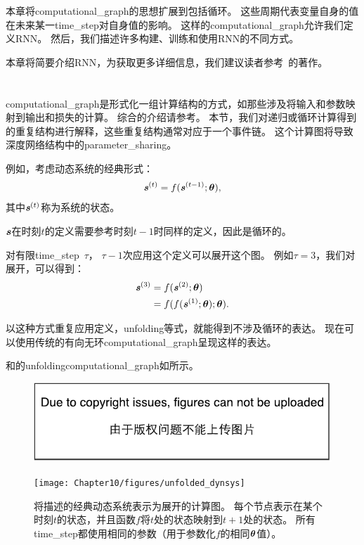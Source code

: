 本章将\gls{computational_graph}的思想扩展到包括循环。
这些周期代表变量自身的值在未来某一\gls{time_step}对自身值的影响。
这样的\gls{computational_graph}允许我们定义\gls{RNN}。
然后，我们描述许多构建、训练和使用\gls{RNN}的不同方式。

本章将简要介绍\gls{RNN}，为获取更多详细信息，我们建议读者参考~\cite{Graves-book2012}的著作。


\section{}
\label{sec:unfolding_computational_graphs}
\gls{computational_graph}是形式化一组计算结构的方式，如那些涉及将输入和参数映射到输出和损失的计算。
综合的介绍请参考。
本节，我们对递归或循环计算得到的重复结构进行解释，这些重复结构通常对应于一个事件链。
这个计算图将导致深度网络结构中的\gls{parameter_sharing}。

例如，考虑动态系统的经典形式：
\begin{align}
\label{eq:101s}
\boldsymbol{\mathit{s}}^{(t)} = f(\boldsymbol{\mathit{s}}^{(t-1)}; \boldsymbol{\theta}),
\end{align}
其中$ \boldsymbol{\mathit{s}}^{(t)}$称为系统的状态。

$\boldsymbol{\mathit{s}}$在时刻$t$的定义需要参考时刻$t-1$时同样的定义，因此是循环的。

对有限\gls{time_step}~$\tau$， $\tau-1$次应用这个定义可以展开这个图。
例如$\tau = 3$，我们对展开，可以得到：
\begin{align}
 \boldsymbol{\mathit{s}}^{(3)} &= f(\boldsymbol{\mathit{s}}^{(2)}; \boldsymbol{\theta}) \\
 & = f(f(\boldsymbol{\mathit{s}}^{(1)}; \boldsymbol{\theta}) ; \boldsymbol{\theta}).
  \label{eq:103s}
\end{align}

以这种方式重复应用定义，\gls{unfolding}等式，就能得到不涉及循环的表达。
现在可以使用传统的有向无环\gls{computational_graph}呈现这样的表达。

和的\gls{unfolding}\gls{computational_graph}如所示。
\begin{figure}[!htb]
\ifOpenSource
\centerline{\includegraphics{figure.pdf}}
\else
\centerline{\texttt{[image: Chapter10/figures/unfolded\_dynsys]}}
\fi
\caption{将描述的经典动态系统表示为展开的计算图。
每个节点表示在某个时刻$t$的状态，并且函数$f$将$t$处的状态映射到$t+1$处的状态。
所有\gls{time_step}都使用相同的参数（用于参数化$f$的相同$\boldsymbol{\theta}$值）。
}
\label{fig:chap10_unfolded_dynsys}
\end{figure}

